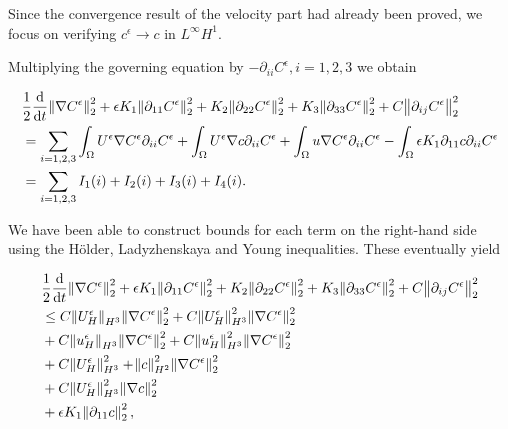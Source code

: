 \documentclass[11pt]{article}
\newcommand*\diff{\mathop{}\!\mathrm{d}}
\begin{document}
Since the convergence result of the velocity part had already been proved, we focus on verifying $c^\epsilon \to c$ in $L^\infty H^1.$

Multiplying the governing equation by $- \partial_{ii} C^\epsilon, i=1,2,3$ we obtain

\begin{equation}
  \begin{split}
      & \frac{1}{2}\frac{\diff}{\diff t} \norm{\nabla C^\epsilon}_2^2 + \epsilon K_1 \norm{\partial_{11} C^\epsilon}_2^2 + K_2 \norm{\partial_{22} C^\epsilon}_2^2 + K_3 \norm{\partial_{33} C^\epsilon}_2^2 + C \norm{\partial_{ij} C^\epsilon}_2^2 \\
      & = \sum_{i = 1,2,3} \int_\Omega U^\epsilon \nabla C^\epsilon \partial_{ii} C^\epsilon + \int_\Omega U^\epsilon \nabla c \partial_{ii} C^\epsilon + \int_\Omega u \nabla C^\epsilon \partial_{ii} C^\epsilon - \int_\Omega \epsilon K_1 \partial_{11} c \partial_{ii} C^\epsilon \\
      & = \sum_{i = 1,2,3} I_1(i)  + I_2(i) + I_3(i) + I_4(i).
  \end{split}
\end{equation}

We have been able to construct bounds for each term on the right-hand side using the H\"older, Ladyzhenskaya and Young inequalities. These eventually yield

\begin{equation}
  \begin{split}
    & \frac{1}{2} \frac{\diff}{\diff t} \norm{\nabla C^\epsilon}_2^2 + \epsilon K_1 \norm{\partial_{11} C^\epsilon}_2^2 + K_2 \norm{\partial_{22} C^\epsilon}_2^2 + K_3 \norm{\partial_{33} C^\epsilon}_2^2 + C \norm{\partial_{ij} C^\epsilon}_2^2 \\
    & \leq C \norm{U_H^\epsilon}_{H^3} \norm{\nabla C^\epsilon}_2^2 + C \norm{U_H^\epsilon}_{H^3}^2 \norm{\nabla C^\epsilon}_2^2 \\
    & + C \norm{u_H^\epsilon}_{H^3} \norm{\nabla C^\epsilon}_2^2 + C \norm{u_H^\epsilon}_{H^3}^2 \norm{\nabla C^\epsilon}_2^2 \\
    & + C \norm{U_H^\epsilon}_{H^3}^2 + \norm{c}_{H^2}^2 \norm{\nabla C^\epsilon}_2^2 \\
    & + C \norm{U_H^\epsilon}_{H^3}^2 \norm{\nabla c}_2^2 \\
    & + \epsilon K_1 \norm{\partial_{11} c}_2^2,
  \end{split}
\end{equation}
\end{document}
